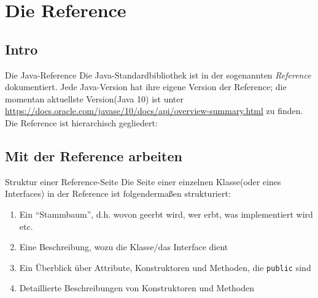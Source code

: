\section{Die Reference}
\subsection{Intro}

\begin{frame}{Die Java-Reference}
    Die Java-Standardbibliothek ist in der sogenannten \textit{Reference} dokumentiert. Jede Java-Version hat ihre eigene Version der Reference;
    die momentan aktuellste Version(Java 10) ist unter \small\url{https://docs.oracle.com/javase/10/docs/api/overview-summary.html} \normalsize zu finden.\\
    \pause
    Die Reference ist hierarchisch gegliedert: \\
    \smallskip \small
\end{frame}

\subsection{Mit der Reference arbeiten}
\begin{frame}{Struktur einer Reference-Seite}
    Die Seite einer einzelnen Klasse(oder eines Interfaces) in der Reference ist folgendermaßen strukturiert:
    \begin{enumerate}[<+->]
        \item Ein \enquote{Stammbaum}, d.h. wovon geerbt wird, wer erbt, was implementiert wird etc.
        \item Eine Beschreibung, wozu die Klasse/das Interface dient
        \item Ein Überblick über Attribute, Konstruktoren und Methoden, die \texttt{public} sind
        \item Detaillierte Beschreibungen von Konstruktoren und Methoden
    \end{enumerate}
\end{frame}

